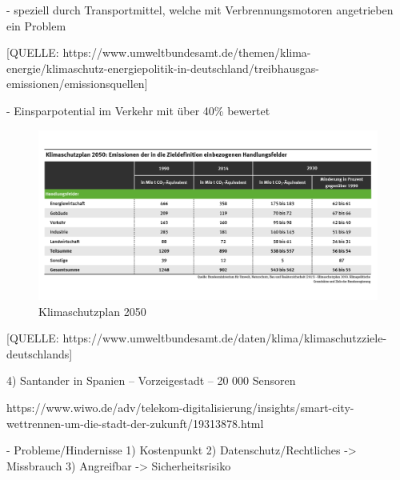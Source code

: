-	speziell durch Transportmittel, welche mit Verbrennungsmotoren angetrieben ein Problem

[QUELLE: https://www.umweltbundesamt.de/themen/klima-energie/klimaschutz-energiepolitik-in-deutschland/treibhausgas-emissionen/emissionsquellen]

-	Einsparpotential im Verkehr mit über 40\% bewertet


\begin{figure}[ht]
	\includegraphics[width=\textwidth]{images/klimaschutzplan2050.png}
	\caption{Klimaschutzplan 2050}
	\label{fig4}
\end{figure}
[QUELLE: https://www.umweltbundesamt.de/daten/klima/klimaschutzziele-deutschlands]

4)	Santander in Spanien – Vorzeigestadt – 20 000 Sensoren

https://www.wiwo.de/adv/telekom-digitalisierung/insights/smart-city-wettrennen-um-die-stadt-der-zukunft/19313878.html



-	Probleme/Hindernisse
1)	Kostenpunkt
2)	Datenschutz/Rechtliches -> Missbrauch
3)	Angreifbar -> Sicherheitsrisiko



\clearpage
